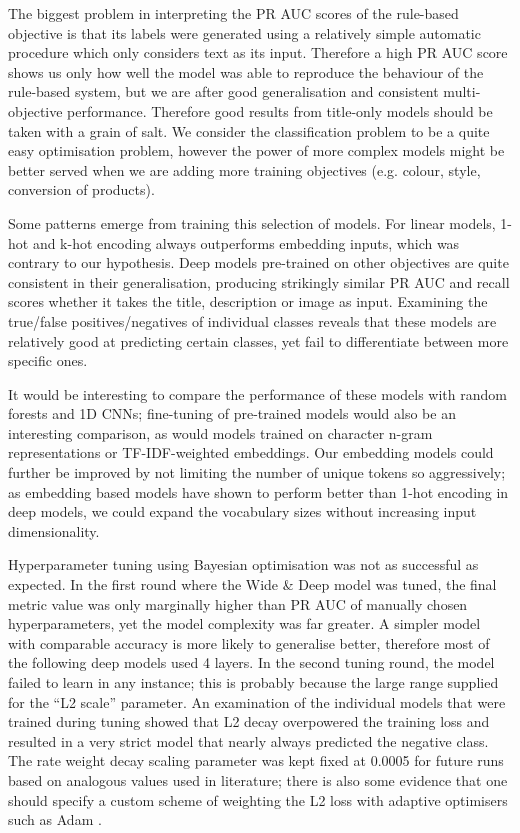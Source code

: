 The biggest problem in interpreting the PR AUC scores of the rule-based objective is that its labels were generated using a relatively simple automatic procedure which only considers text as its input.
Therefore a high PR AUC score shows us only how well the model was able to reproduce the behaviour of the rule-based system, but we are after good generalisation and consistent multi-objective performance.
Therefore good results from title-only models should be taken with a grain of salt.
We consider the classification problem to be a quite easy optimisation problem, however the power of more complex models might be better served when we are adding more training objectives (e.g. colour, style, conversion of products).

Some patterns emerge from training this selection of models.
For linear models, 1-hot and k-hot encoding always outperforms embedding inputs, which was contrary to our hypothesis.
Deep models pre-trained on other objectives are quite consistent in their generalisation, producing strikingly similar PR AUC and recall scores whether it takes the title, description or image as input.
Examining the true/false positives/negatives of individual classes reveals that these models are relatively good at predicting certain classes, yet fail to differentiate between more specific ones.

It would be interesting to compare the performance of these models with random forests and 1D CNNs; fine-tuning of pre-trained models would also be an interesting comparison, as would models trained on character n-gram representations or TF-IDF-weighted embeddings.
Our embedding models could further be improved by not limiting the number of unique tokens so aggressively; as embedding based models have shown to perform better than 1-hot encoding in deep models, we could expand the vocabulary sizes without increasing input dimensionality.

Hyperparameter tuning using Bayesian optimisation was not as successful as expected.
In the first round where the Wide \& Deep model was tuned, the final metric value was only marginally higher than PR AUC of manually chosen hyperparameters, yet the model complexity was far greater.
A simpler model with comparable accuracy is more likely to generalise better, therefore most of the following deep models used 4 layers.
In the second tuning round, the model failed to learn in any instance; this is probably because the large range supplied for the ``L2 scale'' parameter.
An examination of the individual models that were trained during tuning showed that L2 decay overpowered the training loss and resulted in a very strict model that nearly always predicted the negative class.
The rate weight decay scaling parameter was kept fixed at 0.0005 for future runs based on analogous values used in literature; there is also some evidence that one should specify a custom scheme of weighting the L2 loss with adaptive optimisers such as Adam \cite{fix_adam}.

